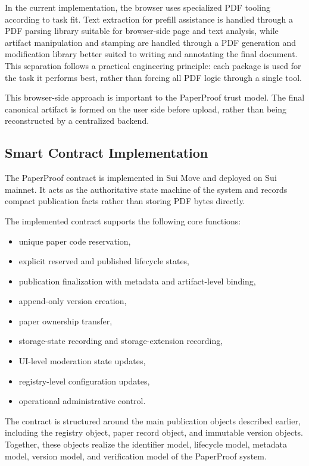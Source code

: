 \documentclass[journal]{IEEEtran}
\begin{document}
In the current implementation, the browser uses specialized PDF tooling according to task fit. Text extraction for prefill assistance is handled through a PDF parsing library suitable for browser-side page and text analysis, while artifact manipulation and stamping are handled through a PDF generation and modification library better suited to writing and annotating the final document. This separation follows a practical engineering principle: each package is used for the task it performs best, rather than forcing all PDF logic through a single tool.

This browser-side approach is important to the PaperProof trust model. The final canonical artifact is formed on the user side before upload, rather than being reconstructed by a centralized backend.

\subsection{Smart Contract Implementation}

The PaperProof contract is implemented in Sui Move and deployed on Sui mainnet. It acts as the authoritative state machine of the system and records compact publication facts rather than storing PDF bytes directly.

The implemented contract supports the following core functions:
\begin{itemize}
    \item unique paper code reservation,
    \item explicit reserved and published lifecycle states,
    \item publication finalization with metadata and artifact-level binding,
    \item append-only version creation,
    \item paper ownership transfer,
    \item storage-state recording and storage-extension recording,
    \item UI-level moderation state updates,
    \item registry-level configuration updates,
    \item operational administrative control.
\end{itemize}


The contract is structured around the main publication objects described earlier, including the registry object, paper record object, and immutable version objects. Together, these objects realize the identifier model, lifecycle model, metadata model, version model, and verification model of the PaperProof system.
\end{document}
